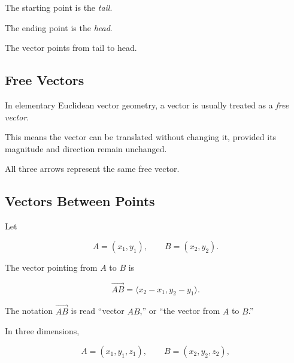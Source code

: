 The starting point is the \emph{tail}.

The ending point is the \emph{head}.

The vector points from tail to head.

\subsection{Free Vectors}
\label{subsec:free-vectors}

In elementary Euclidean vector geometry, a vector is usually treated as a
\emph{free vector}.

This means the vector can be translated without changing it, provided its
magnitude and direction remain unchanged.

\begin{centereddiagram}
\end{centereddiagram}

All three arrows represent the same free vector.

\subsection{Vectors Between Points}
\label{subsec:vectors-between-points}

Let

\[ A=(x_1,y_1),\qquad B=(x_2,y_2). \]

The vector pointing from \(A\) to \(B\) is

\[ \boxed{\overrightarrow{AB}=\langle x_2-x_1,y_2-y_1\rangle.} \]

The notation \(\overrightarrow{AB}\) is read ``vector \(AB\),'' or
``the vector from \(A\) to \(B\).''

In three dimensions,

\[
A=(x_1,y_1,z_1),\qquad
B=(x_2,y_2,z_2),
\]

